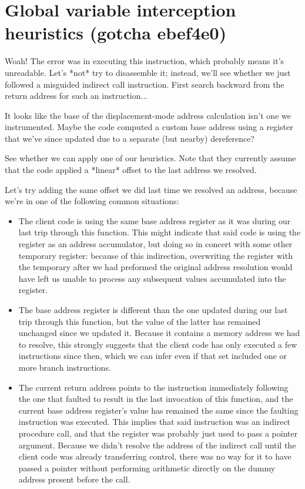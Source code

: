 \documentclass[12pt,letterpaper]{book}
\begin{document}
\section{Global variable interception heuristics (gotcha ebef4e0)}

Woah!  The error was in executing this instruction, which probably means it's
unreadable.  Let's *not* try to disassemble it; instead, we'll see whether we
just followed a misguided indirect call instruction.  First search backward from
the return address for such an instruction...

It looks like the base of the displacement-mode address calculation isn't one we
instrumented.  Maybe the code computed a custom base address using a register
that we've since updated due to a separate (but nearby) dereference?

See whether we can apply one of our heuristics.  Note that they currently assume
that the code applied a *linear* offset to the last address we resolved.

Let's try adding the same offset we did last time we resolved an address,
because we're in one of the following common situations:
\begin{itemize}
\item The client code is using the same base address register as it was
	during our last trip through this function.  This might indicate that
	said code is using the register as an address accumulator, but doing
	so in concert with some other temporary register: because of this
	indirection, overwriting the register with the temporary after we
	had preformed the original address resolution would have left us
	unable to process any subsequent values accumulated into the register.
\item The base address register is different than the one updated during our
	last trip through this function, but the value of the latter has
	remained unchanged since we updated it.  Because it contains a memory
	address we had to resolve, this strongly suggests that the client code
	has only executed a few instructions since then, which we can infer
	even if that set included one or more branch instructions.
\item The current return address points to the instruction immediately
	following the one that faulted to result in the last invocation of
	this function, and the current base address register's value has
	remained the same since the faulting instruction was executed.  This
	implies that said instruction was an indirect procedure call, and that
	the register was probably just used to pass a pointer argument.
	Because we didn't resolve the address of the indirect call until the
	client code was already transferring control, there was no way for it
	to have passed a pointer without performing arithmetic directly on the
	dummy address present before the call.
\end{itemize}
\end{document}
